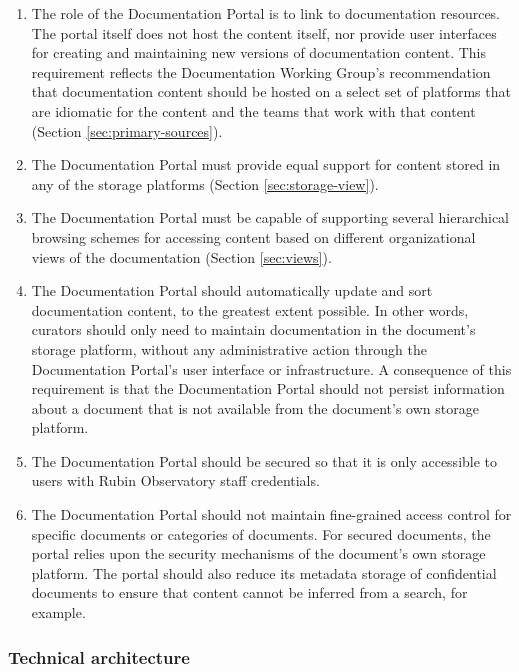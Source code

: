 \begin{enumerate}
  \item The role of the Documentation Portal is to link to documentation resources.
  The portal itself does not host the content itself, nor provide user interfaces for creating and maintaining new versions of documentation content.
  This requirement reflects the Documentation Working Group's recommendation that documentation content should be hosted on a select set of platforms that are idiomatic for the content and the teams that work with that content (Section \ref{sec:primary-sources}).

  \item The Documentation Portal must provide equal support for content stored in any of the storage platforms (Section \ref{sec:storage-view}).

  \item The Documentation Portal must be capable of supporting several hierarchical browsing schemes for accessing content based on different organizational views of the documentation (Section \ref{sec:views}).

  \item The Documentation Portal should automatically update and sort documentation content, to the greatest extent possible.
  In other words, curators should only need to maintain documentation in the document's storage platform, without any administrative action through the Documentation Portal's user interface or infrastructure.
  A consequence of this requirement is that the Documentation Portal should not persist information about a document that is not available from the document's own storage platform.

  \item The Documentation Portal should be secured so that it is only accessible to users with Rubin Observatory staff credentials.

  \item The Documentation Portal should not maintain fine-grained access control for specific documents or categories of documents.
  For secured documents, the portal relies upon the security mechanisms of the document's own storage platform.
  The portal should also reduce its metadata storage of confidential documents to ensure that content cannot be inferred from a search, for example.
\end{enumerate}

\subsubsection{Technical architecture}

